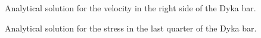 \documentclass{article}
\begin{document}

\begin{figure}\sidecaption
  \centering
  \caption[Velocities values in the right side of the Dyka
  bar]{Analytical solution for the velocity in the right side of the Dyka bar.}
  \label{fig:vel_analytics_dyka}
\end{figure}

\begin{figure}\sidecaption
  \centering
  \caption[Stress values in the last quarter side of the Dyka
  bar]{Analytical solution for the stress in the last quarter of the Dyka bar.}
  \label{fig:stress_analytics_dyka}
\end{figure}
\end{document}

